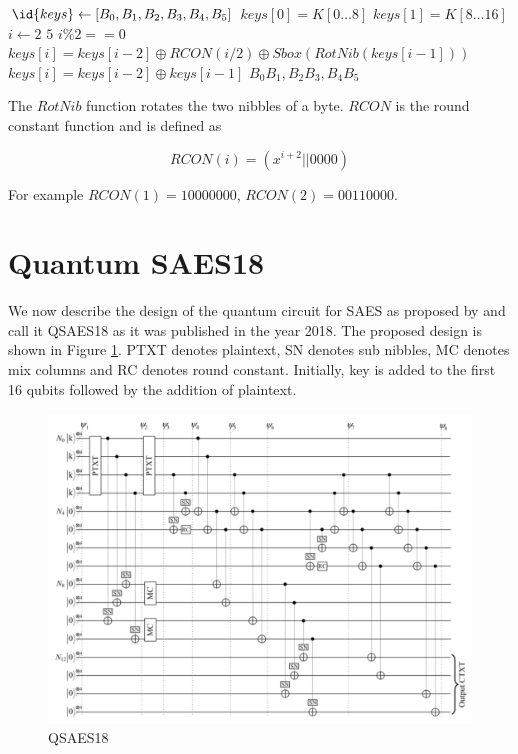 \documentclass[preprint]{transcrypto}
\begin{document}
\begin{codebox}
\label{proc:ke}
\li $\id{keys} \gets [B_0,B_1,B_2,B_3,B_4,B_5]$
\li $keys[0] = K[0 \dots 8]$
\li $keys[1] = K[8 \dots 16]$
\li  \For $i \gets 2$ \To $5$
\li     \Do
                \If $i\%2 == 0$
\li                 \Then
                        $keys[i] = keys[i-2] \oplus RCON(i/2) \oplus Sbox(RotNib(keys[i-1]))$
\li                \Else
\li                    $keys[i] = keys[i-2]\oplus keys[i-1]$
                    \End
        \End
\li \Return $B_0B_1, B_2B_3, B_4B_5$
\end{codebox}

The $RotNib$ function rotates the two nibbles of a byte. $RCON$ is the round constant function and is defined as

\[
    RCON(i) = (x^{i+2} || 0000)
\]

For example $RCON(1) = 10000000$, $RCON(2) = 00110000$.

\section{Quantum SAES18}\label{sec:qsaes18}

We now describe the design of the quantum circuit for SAES as proposed by \cite{Almazrooie} and call it QSAES18 as it was published in the year 2018. The proposed design is shown in Figure \ref{fig:qaes18}. PTXT denotes plaintext, SN denotes sub nibbles, MC denotes mix columns and RC denotes round constant. Initially, key is added to the first 16 qubits followed by the addition of plaintext. 

\begin{figure}[h!]
    \centering
    \includegraphics[width=\linewidth]{saes18/qsaes18.png}
    \caption{QSAES18 \cite{Almazrooie}}
    \label{fig:qaes18}
\end{figure}
\end{document}
